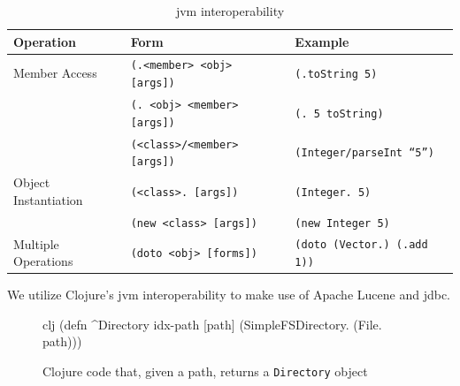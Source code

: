			\begin{table}
				\centering
				
				\begin{tabular}{lll}
					\toprule
					Operation & Form & Example \\
					\midrule
					Member Access & \texttt{(.<member> <obj> [args])} & \texttt{(.toString 5)} \\
					 & \texttt{(. <obj> <member> [args])} & \texttt{(. 5 toString)} \\
					 & \texttt{(<class>/<member> [args])} & \texttt{(Integer/parseInt ``5'')} \\
					Object Instantiation & \texttt{(<class>. [args])} & \texttt{(Integer. 5)} \\
					 & \texttt{(new <class> [args])} & \texttt{(new Integer 5)} \\
					Multiple Operations & \texttt{(doto <obj> [forms])} & \texttt{(doto (Vector.) (.add 1))} \\
					\bottomrule
				\end{tabular}
				
				\caption{\gls{jvm} interoperability}
				\label{tbl:jvm-interop-syntax}
			\end{table}
			
			We utilize Clojure's \gls{jvm} interoperability to make use of Apache Lucene and \gls{jdbc}.
			
			\begin{figure}[H]
				\begin{singlespaced}
					\begin{pygments}{clj}
(defn ^Directory idx-path
  [path]
  (SimpleFSDirectory. (File. path)))
					\end{pygments}
				\end{singlespaced}
				
				\caption{Clojure code that, given a path, returns a \texttt{Directory} object}
			\end{figure}